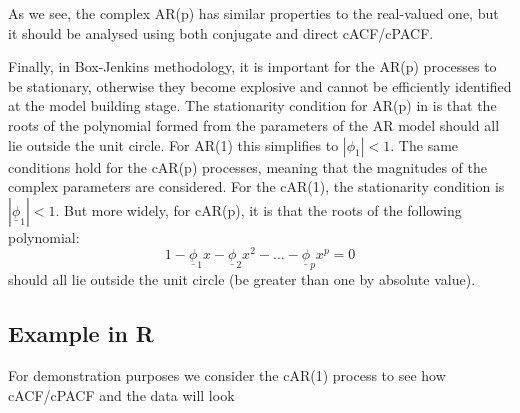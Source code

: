 \documentclass[
]{book}
\begin{document}
As we see, the complex AR(p) has similar properties to the real-valued one, but it should be analysed using both conjugate and direct cACF/cPACF.

Finally, in Box-Jenkins methodology, it is important for the AR(p) processes to be stationary, otherwise they become explosive and cannot be efficiently identified at the model building stage. The stationarity condition for AR(p) in \citet{Box1976} is that the roots of the polynomial formed from the parameters of the AR model should all lie outside the unit circle. For AR(1) this simplifies to \(|\phi_1|<1\). The same conditions hold for the cAR(p) processes, meaning that the magnitudes of the complex parameters are considered. For the cAR(1), the stationarity condition is \(|\underline{\phi}_1|<1\). But more widely, for cAR(p), it is that the roots of the following polynomial:
\begin{equation}
    1 - \underline{\phi}_1 x - \underline{\phi}_2 x^2 - \dots - \underline{\phi}_p x^p = 0
    \label{eq:ComplexARPolyRoots}
\end{equation}
should all lie outside the unit circle (be greater than one by absolute value).

\hypertarget{example-in-r-1}{%
\subsection{Example in R}\label{example-in-r-1}}

For demonstration purposes we consider the cAR(1) process to see how cACF/cPACF and the data will look
\end{document}
